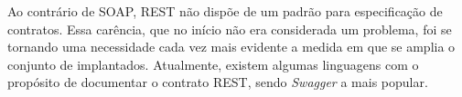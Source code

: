 Ao contrário de SOAP, REST não dispõe de um padrão para
especificação de contratos. Essa carência, que no início não era considerada um problema, foi se
tornando uma necessidade cada vez mais evidente a medida em que se amplia o
conjunto de \wss{} implantados. Atualmente, existem algumas linguagens com o
propósito de documentar o contrato REST, sendo \textit{Swagger} a mais
popular.

% 
% 
% 
% 



